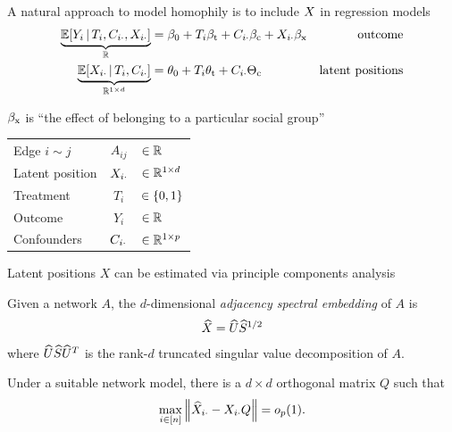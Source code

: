 \documentclass[aspectratio=169]{beamer}
\theoremstyle{remark}
\begin{document}
\begin{frame}{A natural approach to model homophily is to include $X$ in regression models}
    \begin{equation*}
        \begin{aligned}
            \underbrace{\E[T_i, \C_{i \cdot}, \X_{i \cdot}]{Y_i}}_{\R}
             & = \betazero + T_i \betat + \C_{i \cdot} \betac + \X_{i \cdot} \betax
             & \text{outcome}                                                       \\
            \underbrace{\E[T_i, \C_{i \cdot}]{\X_{i \cdot}}}_{\R^{1 \times d}}
             & = \thetazero + T_i \thetat + \C_{i \cdot} \Thetac
             & \text{latent positions}
        \end{aligned}
    \end{equation*}
    \begin{center}
        $\beta_\text{x}$ is ``the effect of belonging to a particular social group'' \\
    \end{center}
    \footnotesize
    \begin{table}[]
        \begin{tabular}{lcl}
            Edge $i \sim j$ & $A_{ij}$       & $\in \mathbb{R}$              \\
            Latent position & $X_{i \cdot}$ & $\in \mathbb{R}^{1 \times d}$ \\
            Treatment       & $T_i$          & $\in \{0, 1\}$      \\
            Outcome         & $Y_i$          & $\in \mathbb{R}$              \\
            Confounders     & $C_{i \cdot}$ & $\in \mathbb{R}^{1 \times p}$ \\
        \end{tabular}
    \end{table}
\end{frame}

\begin{frame}{Latent positions $X$ can be estimated via principle components analysis}
    \begin{definition}[ASE]
        Given a network $A$, the $d$-dimensional \emph{adjacency spectral embedding} of $A$ is
        \begin{align*}
            \widehat{X} = \widehat{U} \widehat{S}^{1/2}
        \end{align*}
        \noindent where $\widehat{U} \widehat{S} \widehat{U}^T$ is the rank-$d$ truncated singular value decomposition of $A$.
    \end{definition}
    \begin{lemma}
        Under a suitable network model, there is a $d \times d$ orthogonal matrix $Q$ such that
        \begin{equation*}
            \max_{i \in [n]} \, \norm*{\Xhat_{i \cdot} - \X_{i \cdot} Q} = \op{1}.
        \end{equation*}
    \end{lemma}
\end{frame}
\end{document}
